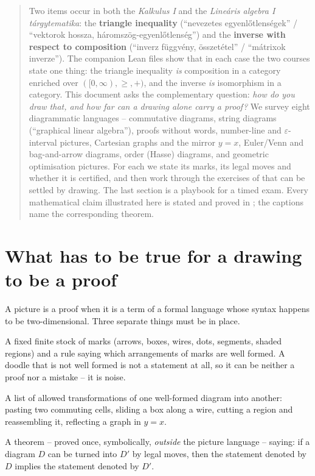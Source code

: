 \begin{abstract}
\noindent
Two items occur in both the \emph{Kalkulus I} and the \emph{Line\'aris algebra I}
\emph{t\'argytematika}: the \textbf{triangle inequality} (``nevezetes
egyenl\H otlens\'egek'' / ``vektorok hossza, h\'aromsz\"og-egyenl\H otlens\'eg'') and the
\textbf{inverse with respect to composition} (``inverz f\"uggv\'eny, \"osszet\'etel'' /
``m\'atrixok inverze''). The companion Lean files show that in each case the two courses
state one thing: the triangle inequality \emph{is} composition in a category enriched
over $([0,\infty),\ge,+)$, and the inverse \emph{is} isomorphism in a category. This
document asks the complementary question: \emph{how do you draw that, and how far can a
drawing alone carry a proof?} We survey eight diagrammatic languages -- commutative
diagrams, string diagrams (``graphical linear algebra''), proofs without words,
number-line and $\varepsilon$-interval pictures, Cartesian graphs and the mirror $y=x$,
Euler/Venn and bag-and-arrow diagrams, order (Hasse) diagrams, and geometric optimisation
pictures. For each we state its marks, its legal moves and whether it is certified, and
then work through the exercises of  that can be settled by
drawing. The last section is a playbook for a timed exam. Every mathematical claim
illustrated here is stated and proved in ; the
captions name the corresponding theorem.
\end{abstract}

\tableofcontents

\section{What has to be true for a drawing to be a proof}
\label{sec:what}

A picture is a proof when it is a term of a formal language whose syntax happens to be
two-dimensional. Three separate things must be in place.

\begin{description}[leftmargin=2.2em,style=nextline]
\item[Syntax.] A fixed finite stock of marks (arrows, boxes, wires, dots, segments,
  shaded regions) and a rule saying which arrangements of marks are well formed. A doodle
  that is not well formed is not a statement at all, so it can be neither a proof nor a
  mistake -- it is noise.
\item[Legal moves.] A list of allowed transformations of one well-formed diagram into
  another: pasting two commuting cells, sliding a box along a wire, cutting a region and
  reassembling it, reflecting a graph in $y=x$.
\item[Soundness.] A theorem -- proved once, symbolically, \emph{outside} the picture
  language -- saying: if a diagram $D$ can be turned into $D'$ by legal moves, then the
  statement denoted by $D$ implies the statement denoted by $D'$.
\end{description}

